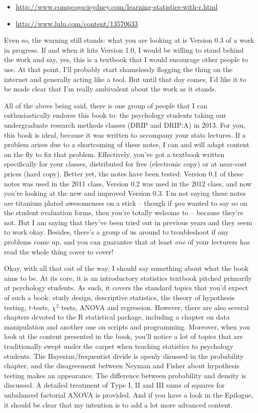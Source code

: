 \documentclass[]{book}
\providecommand{\tightlist}{%
  \setlength{\itemsep}{0pt}\setlength{\parskip}{0pt}}
\begin{document}
\begin{itemize}
\tightlist
\item
  \url{http://www.compcogscisydney.com/learning-statistics-with-r.html}
\item
  \url{http://www.lulu.com/content/13570633}
\end{itemize}

Even so, the warning still stands: what you are looking at is Version 0.3 of a work in progress. If and when it hits Version 1.0, I would be willing to stand behind the work and say, yes, this is a textbook that I would encourage other people to use. At that point, I'll probably start shamelessly flogging the thing on the internet and generally acting like a tool. But until that day comes, I'd like it to be made clear that I'm really ambivalent about the work as it stands.

All of the above being said, there is one group of people that I can enthusiastically endorse this book to: the psychology students taking our undergraduate research methods classes (DRIP and DRIP:A) in 2013. For you, this book is ideal, because it was written to accompany your stats lectures. If a problem arises due to a shortcoming of these notes, I can and will adapt content on the fly to fix that problem. Effectively, you've got a textbook written specifically for your classes, distributed for free (electronic copy) or at near-cost prices (hard copy). Better yet, the notes have been tested: Version 0.1 of these notes was used in the 2011 class, Version 0.2 was used in the 2012 class, and now you're looking at the new and improved Version 0.3. I'm not saying these notes are titanium plated awesomeness on a stick -- though if \emph{you} wanted to say so on the student evaluation forms, then you're totally welcome to -- because they're not. But I am saying that they've been tried out in previous years and they seem to work okay. Besides, there's a group of us around to troubleshoot if any problems come up, and you can guarantee that at least \emph{one} of your lecturers has read the whole thing cover to cover!

Okay, with all that out of the way, I should say something about what the book aims to be. At its core, it is an introductory statistics textbook pitched primarily at psychology students. As such, it covers the standard topics that you'd expect of such a book: study design, descriptive statistics, the theory of hypothesis testing, \(t\)-tests, \(\chi^2\) tests, ANOVA and regression. However, there are also several chapters devoted to the R statistical package, including a chapter on data manipulation and another one on scripts and programming. Moreover, when you look at the content presented in the book, you'll notice a lot of topics that are traditionally swept under the carpet when teaching statistics to psychology students. The Bayesian/frequentist divide is openly disussed in the probability chapter, and the disagreement between Neyman and Fisher about hypothesis testing makes an appearance. The difference between probability and density is discussed. A detailed treatment of Type I, II and III sums of squares for unbalanced factorial ANOVA is provided. And if you have a look in the Epilogue, it should be clear that my intention is to add a lot more advanced content.
\end{document}
